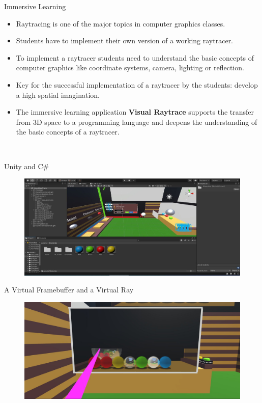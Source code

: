 \documentclass[final,hyperref={pdfpagelabels=false}]{beamer}
\begin{document}
\begin{frame}[t]
\begin{columns}[t]
\begin{column}{0.465\textwidth}
\begin{block}{Immersive Learning}
   \begin{itemize}
   \item Raytracing is one of the major topics in computer graphics classes.
   \item Students have to implement their own version of a working raytracer.
   \item To implement a raytracer students need to understand the basic concepts of computer graphics
   like coordinate systems, camera, lighting or reflection.
   \item Key for the successful implementation of a raytracer by the students: develop a high spatial imagination.
   \item The immersive learning application \textbf{Visual Raytrace} supports the transfer from 3D space
   to a programming language and deepens the understanding of the basic concepts of a raytracer.

       \vspace{1.55cm}$\:$
   \end{itemize}

\end{block}

\vspace*{2.0cm}

\begin{block}{Unity and C\#}
    \begin{figure}
    	\centering
        \includegraphics[width=0.95\linewidth]{unityIDE}
    \end{figure}
\end{block}

\begin{block}{A Virtual Framebuffer and a Virtual Ray}
    \begin{figure}
    	\centering
        \includegraphics[width=0.95\linewidth]{duringProcessEyeView}
    \end{figure}
\end{block}


\end{column}
\end{columns}
\end{frame}
\end{document}
